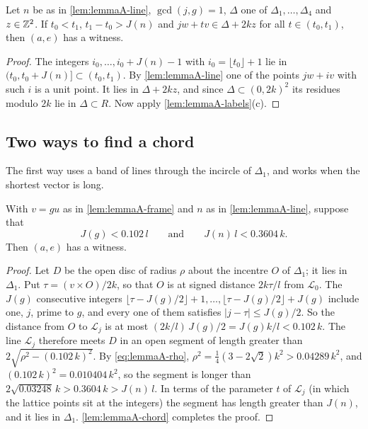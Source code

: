 \begin{lemma}[chords]
\label{lem:lemmaA-chord}
Let $n$ be as in \autoref{lem:lemmaA-line}, $\gcd(j,g)=1$, $\Delta$ one of
$\Delta_1,\dots,\Delta_4$ and $z\in\mathbb{Z}^2$. If $t_0<t_1$, $t_1-t_0>J(n)$ and
$jw+tv\in\Delta+2kz$ for all $t\in(t_0,t_1)$, then $(a,e)$ has a witness.
\end{lemma}

\begin{proof}
The integers $i_0,\dots,i_0+J(n)-1$ with $i_0=\lfloor t_0\rfloor+1$ lie in
$(t_0,t_0+J(n)]\subset(t_0,t_1)$. By \autoref{lem:lemmaA-line} one of the
points $jw+iv$ with such $i$ is a unit point. It lies in $\Delta+2kz$, and since
$\Delta\subset(0,2k)^2$ its residues modulo $2k$ lie in $\Delta\subset R$. Now apply
\autoref{lem:lemmaA-labels}(c).
\end{proof}

\subsection{Two ways to find a chord}

The first way uses a band of lines through the incircle of $\Delta_1$, and works
when the shortest vector is long.

\begin{proposition}
\label{prop:lemmaA-band}
With $v=gu$ as in \autoref{lem:lemmaA-frame} and $n$ as in
\autoref{lem:lemmaA-line}, suppose that
\[
J(g)<0.102\,l\qquad\text{and}\qquad J(n)\,l<0.3604\,k.
\]
Then $(a,e)$ has a witness.
\end{proposition}

\begin{proof}
Let $D$ be the open disc of radius $\rho$ about the incentre $O$ of $\Delta_1$;
it lies in $\Delta_1$. Put $\tau=(v\times O)/2k$, so that $O$ is at signed
distance $2k\tau/l$ from $\mathcal L_0$. The $J(g)$ consecutive integers
$\lfloor\tau-J(g)/2\rfloor+1,\dots,\lfloor\tau-J(g)/2\rfloor+J(g)$ include
one, $j$, prime to $g$, and every one of them satisfies $|j-\tau|\le J(g)/2$.
So the distance from $O$ to $\mathcal L_j$ is at most
$(2k/l)\,J(g)/2=J(g)k/l<0.102\,k$. The line $\mathcal L_j$ therefore meets $D$
in an open segment of length greater than $2\sqrt{\rho^2-(0.102\,k)^2}$. By
\eqref{eq:lemmaA-rho}, $\rho^2=\tfrac14(3-2\sqrt2)k^2>0.04289\,k^2$, and
$(0.102\,k)^2=0.010404\,k^2$, so the segment is longer than
$2\sqrt{0.03248}\,k>0.3604\,k>J(n)\,l$. In terms of the parameter $t$ of
$\mathcal L_j$ (in which the lattice points sit at the integers) the segment has
length greater than $J(n)$, and it lies in $\Delta_1$.
\autoref{lem:lemmaA-chord} completes the proof.
\end{proof}


